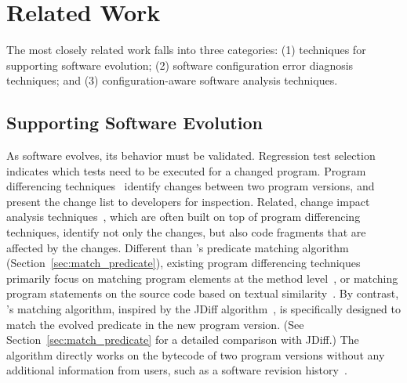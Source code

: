 \section{Related Work}
\label{sec:related}

The most closely related work falls into
three categories: (1) techniques for
supporting software evolution; (2) software
configuration error diagnosis techniques;
and (3) configuration-aware software analysis techniques.

\subsection{Supporting Software Evolution}

As software evolves, its behavior must be validated.
Regression test selection~\cite{regression}
indicates which tests need to be executed for a changed
program.  Program differencing techniques~\cite{Giroux:2006:DIF, Xing:2005:UAO, Thummalapenta:2010:ESM, Kim:2013, Jin:2012:BRF,Nguyen:2010:RBF,Dig:2006:ADR, Kamiya:2002:CMT, Dagenais:2008}
identify changes between two program versions,
and present the change list to developers for inspection.
Related, change impact analysis techniques~\cite{STVR:STVR1475}, which
are often built on top of program differencing
techniques, identify not only the changes, but also
code fragments that are affected by the changes. 
Different than \ourtool's predicate matching
algorithm (Section~\ref{sec:match_predicate}),
existing program differencing techniques primarily focus on matching
program elements at the method level~\cite{frameworkevolution,
Xing:2005:UAO, Kim:2013, Nguyen:2010:RBF,Dig:2006:ADR,
Kamiya:2002:CMT, Dagenais:2008},
or matching program statements on the source code based on
textual similarity~\cite{Horwitz:1990:IST}.
By contrast, \ourtool's matching algorithm, inspired by
the JDiff algorithm~\cite{Apiwattanapong:2004}, is specifically designed 
to match the evolved predicate in the new program version.
(See Section~\ref{sec:match_predicate} for a detailed
comparison with JDiff.)
The algorithm directly works on the bytecode of two program
versions without any additional information from users,
such as a software revision history~\cite{frameworkevolution}.


